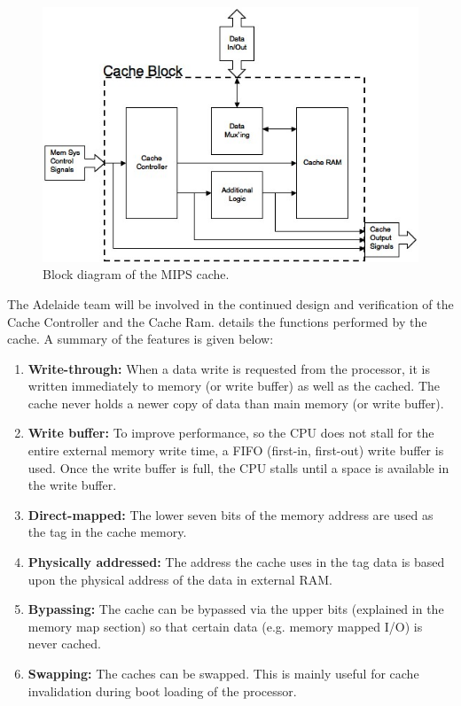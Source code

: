 \begin{figure}
\centering 
\includegraphics[width=\textwidth]{cacheblock.jpg}
\caption{Block diagram of the MIPS cache.}
\label{cacheblock}
\end{figure}

The Adelaide team will be involved in the continued design and
verification of the Cache Controller and the Cache Ram. \cite{various07} details the functions performed by the cache. A summary of the features is given below:
\begin{enumerate}
\item \textbf{Write-through: }When a data write is requested from the processor, it is written immediately to memory (or write buffer) as well as the cached. The cache never holds a newer copy of data than main memory (or write buffer).
\item \textbf{Write buffer: }To improve performance, so the CPU does not stall for the entire external memory write time, a FIFO (first-in, first-out) write buffer is used. Once the write buffer is full, the CPU stalls until a space is available in the write buffer.
\item \textbf{Direct-mapped: }The lower seven bits of the memory address are used as the tag in the cache memory.
\item \textbf{Physically addressed: }The address the cache uses in the tag data is based upon the physical address of the data in external RAM.
\item \textbf{Bypassing: }The cache can be bypassed via the upper bits (explained in the memory map section) so that certain data (e.g. memory mapped I/O) is never cached.
\item \textbf{Swapping: }The caches can be swapped. This is mainly useful for cache invalidation during boot loading of the processor. 
\end{enumerate}

